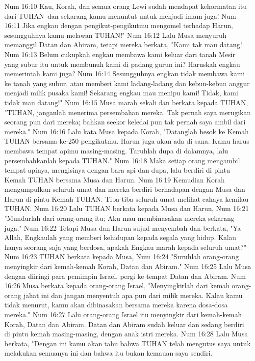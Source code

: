 Num 16:10  Kau, Korah, dan semua orang Lewi sudah mendapat kehormatan itu dari TUHAN--dan sekarang kamu menuntut untuk menjadi imam juga!
Num 16:11  Jika engkau dengan pengikut-pengikutmu mengomel terhadap Harun, sesungguhnya kamu melawan TUHAN!"
Num 16:12  Lalu Musa menyuruh memanggil Datan dan Abiram, tetapi mereka berkata, "Kami tak mau datang!
Num 16:13  Belum cukupkah engkau membawa kami keluar dari tanah Mesir yang subur itu untuk membunuh kami di padang gurun ini? Haruskah engkau memerintah kami juga?
Num 16:14  Sesungguhnya engkau tidak membawa kami ke tanah yang subur, atau memberi kami ladang-ladang dan kebun-kebun anggur menjadi milik pusaka kami! Sekarang engkau mau menipu kami! Tidak, kami tidak mau datang!"
Num 16:15  Musa marah sekali dan berkata kepada TUHAN, "TUHAN, janganlah menerima persembahan mereka. Tak pernah saya merugikan seorang pun dari mereka; bahkan seekor keledai pun tak pernah saya ambil dari mereka."
Num 16:16  Lalu kata Musa kepada Korah, "Datanglah besok ke Kemah TUHAN bersama ke-250 pengikutmu. Harun juga akan ada di sana. Kamu harus membawa tempat apimu masing-masing. Taruhlah dupa di dalamnya, lalu persembahkanlah kepada TUHAN."
Num 16:18  Maka setiap orang mengambil tempat apinya, mengisinya dengan bara api dan dupa, lalu berdiri di pintu Kemah TUHAN bersama Musa dan Harun.
Num 16:19  Kemudian Korah mengumpulkan seluruh umat dan mereka berdiri berhadapan dengan Musa dan Harun di pintu Kemah TUHAN. Tiba-tiba seluruh umat melihat cahaya kemilau TUHAN.
Num 16:20  Lalu TUHAN berkata kepada Musa dan Harun,
Num 16:21  "Mundurlah dari orang-orang itu; Aku mau membinasakan mereka sekarang juga."
Num 16:22  Tetapi Musa dan Harun sujud menyembah dan berkata, "Ya Allah, Engkaulah yang memberi kehidupan kepada segala yang hidup. Kalau hanya seorang saja yang berdosa, apakah Engkau marah kepada seluruh umat?"
Num 16:23  TUHAN berkata kepada Musa,
Num 16:24  "Suruhlah orang-orang menyingkir dari kemah-kemah Korah, Datan dan Abiram."
Num 16:25  Lalu Musa dengan diiringi para pemimpin Israel, pergi ke tempat Datan dan Abiram.
Num 16:26  Musa berkata kepada orang-orang Israel, "Menyingkirlah dari kemah orang-orang jahat ini dan jangan menyentuh apa pun dari milik mereka. Kalau kamu tidak menurut, kamu akan dibinasakan bersama mereka karena dosa-dosa mereka."
Num 16:27  Lalu orang-orang Israel itu menyingkir dari kemah-kemah Korah, Datan dan Abiram. Datan dan Abiram sudah keluar dan sedang berdiri di pintu kemah masing-masing, dengan anak istri mereka.
Num 16:28  Lalu Musa berkata, "Dengan ini kamu akan tahu bahwa TUHAN telah mengutus saya untuk melakukan semuanya ini dan bahwa itu bukan kemauan saya sendiri.
